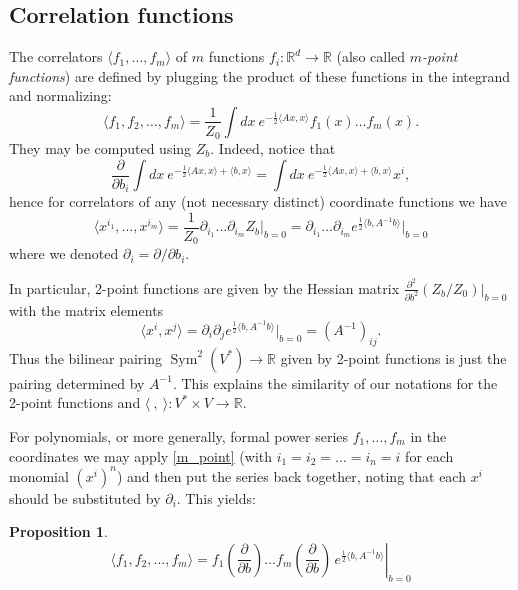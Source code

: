 \documentclass[10pt]{amsart}
\newtheorem{prop}[thm]{Proposition}
\theoremstyle{definition}
\theoremstyle{remark}
\newcommand{\R}{\mathbb R}
\newcommand{\dd}{\partial}
\def\<{\langle}
\def\>{\rangle}
\newcommand{\Sym}{\operatorname{Sym}}
\begin{document}
\subsection{Correlation functions}
The correlators $\<f_1,\dots,f_m\>$ of $m$ functions
$f_i:\R^d\to\R$ (also called {\em $m$-point functions}) are
defined by plugging the product of these functions in the
integrand and normalizing:
\begin{equation}\label{def_corr}
\<f_1,f_2,\dots,f_m\>= \frac1{Z_0}\int dx\ e^{-\frac12\<Ax,x\>}
                        f_1(x)\dots f_m(x).
\end{equation}
They may be computed using $Z_b$. Indeed, notice that
$$
   \frac\dd{\dd b_i}  \int dx\ e^{-\frac12\<Ax,x\>+\<b,x\>}
        =\int dx\ e^{-\frac12\<Ax,x\>+\<b,x\>} x^i,
$$
hence for correlators
of any (not necessary distinct) coordinate functions we have
\begin{equation}\label{m_point}
  \<x^{i_1},\dots,x^{i_m}\>=\frac1{Z_0}\dd_{i_1} \dots\dd_{i_m}Z_b
\big|_{b=0}=\dd_{i_1} \dots \dd_{i_m}e^{\frac12\<b,A^{-1}b\>}
\big|_{b=0}
\end{equation}
where we denoted $\dd_i=\dd/ \dd b_i$.

In particular, 2-point functions are given by the Hessian matrix
$\frac{\dd^2}{\dd b^2}(Z_b/Z_0)\big|_{b=0}$ with the matrix
elements
\begin{equation}\label{eq:hess}
\<x^i,x^j\>=\dd_i\dd_j e^{\frac12 \<b,A^{-1}b\>}\big|_{b=0}
=(A^{-1})_{ij}.
\end{equation}
Thus the bilinear pairing $\Sym^2(V^*)\to\R$ given by 2-point
functions is just the pairing determined by $A^{-1}$. This
explains the similarity of our notations for the 2-point functions
and $\<\ ,\ \>:V^*\times V\to\R$.

For polynomials, or more generally, formal power series $f_1,\dots,
f_m$ in the coordinates we may apply \eqref{m_point} (with
$i_1=i_2=\dots=i_n=i$ for each monomial $(x^i)^n$) and then put
the series back together, noting that each $x^i$ should be
substituted by $\dd_i$. This yields:
\begin{prop}
\begin{equation}\label{corr}
\left. \<f_1,f_2,\dots,f_m\>=f_1 \left( \frac\dd{\dd b} \right)\dots
  f_m  \left( \frac\dd{\dd b}\right) \,  e^{\frac12\<b,A^{-1}b\>} \right|_{b=0}
\end{equation}
\end{prop}
\end{document}
